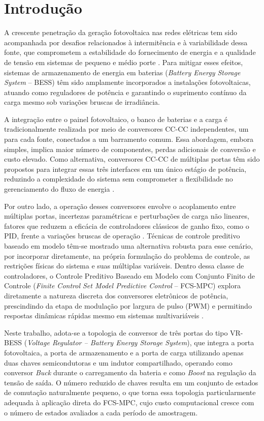 \section{Introdução}
\label{sec:introducao}

A crescente penetração da geração fotovoltaica nas redes elétricas tem sido
acompanhada por desafios relacionados à intermitência e à variabilidade
dessa fonte, que comprometem a estabilidade do fornecimento de energia e a
qualidade de tensão em sistemas de pequeno e médio porte
\citep{ayaz2014improved}. Para mitigar esses efeitos, sistemas de
armazenamento de energia em baterias (\textit{Battery Energy Storage
System} -- BESS) têm sido amplamente incorporados a instalações
fotovoltaicas, atuando como reguladores de potência e garantindo o
suprimento contínuo da carga mesmo sob variações bruscas de irradiância.

A integração entre o painel fotovoltaico, o banco de baterias e a carga é
tradicionalmente realizada por meio de conversores CC-CC independentes, um
para cada fonte, conectados a um barramento comum. Essa abordagem, embora
simples, implica maior número de componentes, perdas adicionais de
conversão e custo elevado. Como alternativa, conversores CC-CC de múltiplas
portas têm sido propostos para integrar essas três interfaces em um único
estágio de potência, reduzindo a complexidade do sistema sem comprometer a
flexibilidade no gerenciamento do fluxo de energia \citep{zhang2025adaptive}.

Por outro lado, a operação desses conversores envolve o acoplamento entre
múltiplas portas, incertezas paramétricas e perturbações de carga não
lineares, fatores que reduzem a eficácia de controladores clássicos de
ganho fixo, como o PID, frente a variações bruscas de operação
\citep{zhang2025adaptive}. Técnicas de controle preditivo baseado em modelo
têm-se mostrado uma alternativa robusta para esse cenário, por incorporar
diretamente, na própria formulação do problema de controle, as restrições
físicas do sistema e suas múltiplas variáveis. Dentro dessa classe de
controladores, o Controle Preditivo Baseado em Modelo com Conjunto Finito
de Controle (\textit{Finite Control Set Model Predictive Control} --
FCS-MPC) explora diretamente a natureza discreta dos conversores
eletrônicos de potência, prescindindo da etapa de modulação por largura de
pulso (PWM) e permitindo respostas dinâmicas rápidas mesmo em sistemas
multivariáveis \citep{ferreira2018finite, wang2023fcsmpc}.

Neste trabalho, adota-se a topologia de conversor de três portas do tipo
VR-BESS (\textit{Voltage Regulator -- Battery Energy Storage System}), que
integra a porta fotovoltaica, a porta de armazenamento e a porta de carga
utilizando apenas duas chaves semicondutoras e um indutor compartilhado,
operando como conversor \textit{Buck} durante o carregamento da bateria e
como \textit{Boost} na regulação da tensão de saída. O número reduzido de
chaves resulta em um conjunto de estados de comutação naturalmente pequeno,
o que torna essa topologia particularmente adequada à aplicação direta do
FCS-MPC, cujo custo computacional cresce com o número de estados avaliados
a cada período de amostragem.

